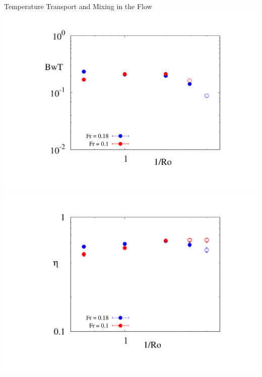 \documentclass{beamer}
\begin{document}
\begin{frame}{Temperature Transport and Mixing in the Flow}
        \centering
        \includegraphics[width=1\textwidth]{images/bflux_plot.pdf}
    \emp
        \centering
        \includegraphics[width=.94\textwidth]{images/mixing_plot.pdf}
    \emp
\end{frame}
\end{document}

